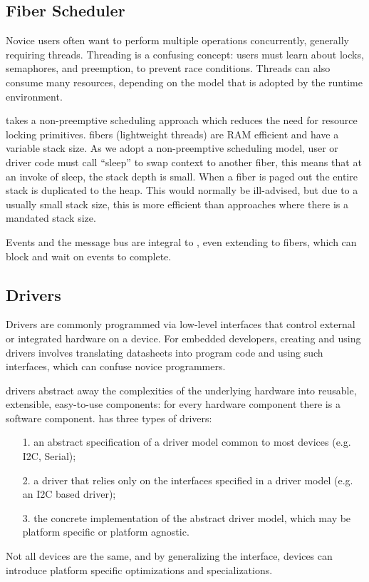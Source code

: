 
\subsection{Fiber Scheduler}
Novice users often want to perform multiple operations concurrently, generally requiring threads. 
Threading is a confusing concept: users must learn about locks, semaphores, and preemption, to prevent race conditions. Threads can also consume many resources, depending on the model that is adopted by the runtime environment.

\CO takes a non-preemptive scheduling approach which reduces the need for resource locking primitives. \CO fibers (lightweight threads) are RAM efficient and have a variable stack size. As we adopt a non-preemptive scheduling model, user or driver code must call ``sleep'' to swap context to another fiber, this means that at an invoke of sleep, the stack depth is small. When a fiber is paged out the entire stack is duplicated to the heap. This would normally be ill-advised, but due to a usually small stack size, this is more efficient than approaches where there is a mandated stack size.

Events and the message bus are integral to \CON, even extending to fibers, which can block and wait on events to complete. 

\subsection{Drivers}

Drivers are commonly programmed via low-level interfaces that control external or integrated hardware on a device. For embedded developers, creating and using drivers involves translating datasheets into program code and using such interfaces, which can confuse novice programmers.

\CO drivers abstract away the complexities of the underlying hardware into reusable, extensible, easy-to-use components: for every hardware component there is a software component. \CO has three types of drivers:
\begin{itemize}
    \item[1.] an abstract specification of a driver model common to most devices (e.g. I2C, Serial);
    \item[2.] a driver that relies only on the interfaces specified in a driver model  (e.g. an I2C based driver);
    \item[3.] the concrete implementation of the abstract driver model, which may be platform specific or platform agnostic.
\end{itemize}
Not all devices are the same, and by generalizing the interface, devices can introduce platform specific optimizations and specializations.

